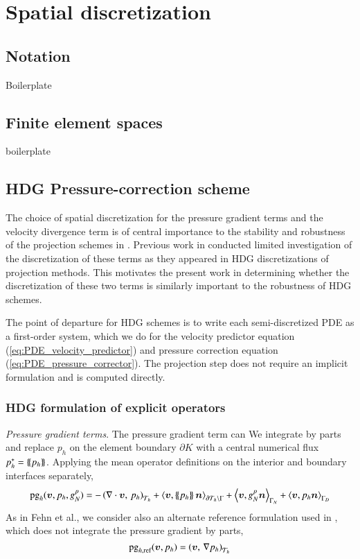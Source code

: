 \section{Spatial discretization}

\subsection{Notation}
Boilerplate

\subsection{Finite element spaces}
boilerplate

\subsection{HDG Pressure-correction scheme}

The choice of spatial discretization for the pressure gradient terms and the velocity divergence term is of central importance to the stability and robustness of the projection schemes in \cite{fehn_robust_2018}. Previous work in \cite{ueckermann_lermusiaux_JCP2016} conducted limited investigation of the discretization of these terms as they appeared in HDG discretizations of projection methods. This motivates the present work in determining whether the discretization of these two terms is similarly important to the robustness of HDG schemes. 

The point of departure for HDG schemes is to write each semi-discretized PDE as a first-order system, which we do for the velocity predictor equation (\ref{eq:PDE_velocity_predictor})  and pressure correction equation (\ref{eq:PDE_pressure_corrector}). The projection step does not require an implicit formulation and is computed directly.

\subsubsection{HDG formulation of explicit operators}

\textit{Pressure gradient terms}. The pressure gradient term can 
We integrate by parts and replace $p_h$ on the element boundary $\partial K$ with a central numerical flux $p^*_h = \left\{\!\left\{p_h\right\}\!\right\} $. Applying the mean operator definitions on the interior and boundary interfaces separately,
\begin{equation}
  \text{pg}_h(\bm{v}, p_h, g_N^p) = -\left(\nabla \cdot \bm{v},\, p_h \right)_{\mathcal{T}_h} 
  + \left\langle \bm{v},\left\{\!\left\{p_h\right\}\!\right\}\bm{n}\right\rangle_{\partial\mathcal{T}_h \setminus \Gamma}
  + \left\langle \bm{v}, g_N^p\bm{n}\right\rangle_{\Gamma_N}
  + \left\langle \bm{v}, p_h\bm{n}\right\rangle_{\Gamma_D}
\end{equation}%
As in Fehn et al., we consider also an alternate reference formulation used in \cite{hesthaven_nodal_2008,ueckermann_lermusiaux_JCP2016}, which does not integrate the pressure gradient by parts,
\begin{equation}
  \text{pg}_{h,\text{ref}}(\bm{v}, p_h) = \left(\bm{v},\, \nabla p_h \right)_{\mathcal{T}_h} 
\end{equation}

